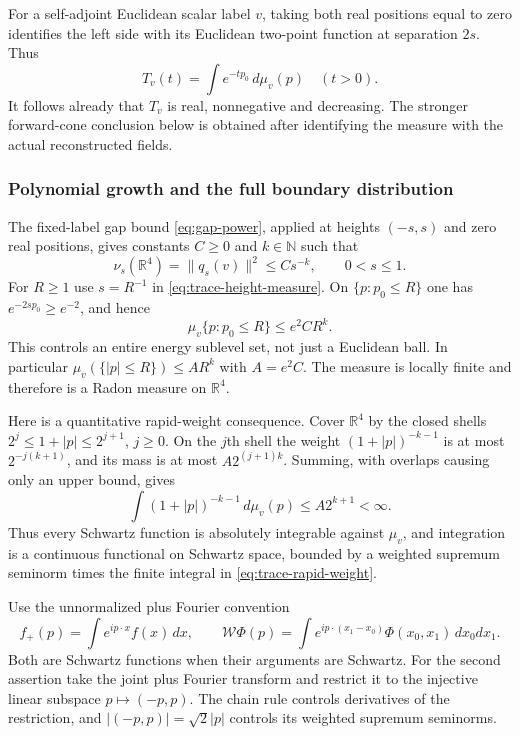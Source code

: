 For a self-adjoint Euclidean scalar label $v$, taking both real positions
equal to zero identifies the left side with its Euclidean two-point
function at separation $2s$. Thus
\begin{equation}\label{eq:trace-positive-laplace}
 T_v(t)=\int e^{-tp_0}\,d\mu_v(p)\quad(t>0).
\end{equation}
It follows already that $T_v$ is real, nonnegative and decreasing. The
stronger forward-cone conclusion below is obtained after identifying the
measure with the actual reconstructed fields.

\subsubsection{Polynomial growth and the full boundary distribution}
The fixed-label gap bound \eqref{eq:gap-power}, applied at heights $(-s,s)$
and zero real positions, gives constants $C\geq0$ and $k\in\mathbb N$
such that
\[
 \nu_s(\mathbb R^4)=\|q_s(v)\|^2\leq Cs^{-k},\qquad0<s\leq1.
\]
For $R\geq1$ use $s=R^{-1}$ in \eqref{eq:trace-height-measure}. On
$\{p:p_0\leq R\}$ one has $e^{-2sp_0}\geq e^{-2}$, and hence
\begin{equation}\label{eq:trace-energy-growth}
 \mu_v\{p:p_0\leq R\}\leq e^2CR^k.
\end{equation}
This controls an entire energy sublevel set, not just a Euclidean ball.
In particular $\mu_v(\{|p|\leq R\})\leq AR^k$ with $A=e^2C$.
The measure is locally finite and therefore is a Radon measure on
$\mathbb R^4$.

Here is a quantitative rapid-weight consequence. Cover $\mathbb R^4$ by
the closed shells $2^j\leq1+|p|\leq2^{j+1}$, $j\geq0$. On the $j$th
shell the weight $(1+|p|)^{-k-1}$ is at most $2^{-j(k+1)}$, and its
mass is at most $A2^{(j+1)k}$. Summing, with overlaps causing only an
upper bound, gives
\begin{equation}\label{eq:trace-rapid-weight}
 \int(1+|p|)^{-k-1}\,d\mu_v(p)\leq A2^{k+1}<\infty.
\end{equation}
Thus every Schwartz function is absolutely integrable against $\mu_v$,
and integration is a continuous functional on Schwartz space, bounded
by a weighted supremum seminorm times the finite integral in
\eqref{eq:trace-rapid-weight}.

Use the unnormalized plus Fourier convention
\[
 f_+(p)=\int e^{ip\cdot x}f(x)\,dx,
 \qquad
 \mathcal W\Phi(p)=\int e^{ip\cdot(x_1-x_0)}\Phi(x_0,x_1)\,dx_0dx_1.
\]
Both are Schwartz functions when their arguments are Schwartz.
For the second assertion take the joint plus Fourier transform and
restrict it to the injective linear subspace $p\mapsto(-p,p)$.
The chain rule controls derivatives of the restriction, and
$|(-p,p)|=\sqrt2|p|$ controls its weighted supremum seminorms.

